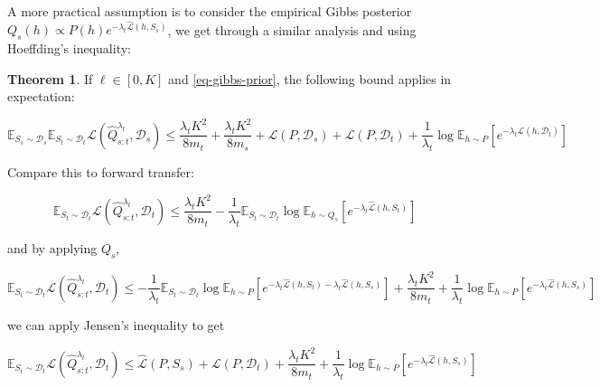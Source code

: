 \documentclass[letterpaper]{article}
\theoremstyle{definition}
\newtheorem{theorem}{Theorem}
\begin{document}

A more practical assumption is to consider the empirical Gibbs posterior $Q_s(h)\propto P(h)e^{-\lambda_t\hat{\mathcal{L}}(h,S_s)}$, we get through a similar analysis and using Hoeffding's inequality:

\begin{theorem}
If $\ell\in[0,K]$ and \eqref{eq-gibbs-prior}, the following bound applies in expectation:

\begin{equation} 
\mathbb{E}_{S_s\sim \mathcal{D}_s}\mathbb{E}_{S_t\sim \mathcal{D}_t}\mathcal{L}( \hat{Q}^{\lambda_t}_{s:t},\mathcal{D}_s)\leq \frac{\lambda_t K^2}{8m_t}+\frac{\lambda_t K^2}{8m_s}+\mathcal{L}(P,\mathcal{D}_s)+\mathcal{L}(P,\mathcal{D}_t) +\frac{1}{\lambda_t}\log\mathbb{E}_{h\sim P}\left [e^{-\lambda_t\mathcal{L}(h,\mathcal{D}_t)} \right ]
\end{equation}
\end{theorem}

Compare this to forward transfer:

\begin{equation*} 
\mathbb{E}_{S_t\sim \mathcal{D}_t}\mathcal{L}( \hat{Q}^{\lambda_t}_{s:t},\mathcal{D}_t)\leq \frac{\lambda_t K^2}{8m_t} - \frac{1}{\lambda_t}\mathbb{E}_{S_t\sim \mathcal{D}_t}\log\mathbb{E}_{h\sim Q_s}\left [e^{-\lambda_t\hat{\mathcal{L}}(h,S_t) }\right ]
\end{equation*}

and by applying $Q_s$,

\begin{equation*} 
\mathbb{E}_{S_t\sim \mathcal{D}_t}\mathcal{L}( \hat{Q}^{\lambda_t}_{s:t},\mathcal{D}_t)\leq -\frac{1}{\lambda_t}\mathbb{E}_{S_t\sim \mathcal{D}_t}\log \mathbb{E}_{h\sim P}\left [e^{-\lambda_t\hat{\mathcal{L}}(h,S_t)-\lambda_t\hat{\mathcal{L}}(h,S_s)}\right ]+\frac{\lambda_t K^2}{8m_t}+\frac{1}{\lambda_t}\log\mathbb{E}_{h\sim P}\left [e^{-\lambda_t\hat{\mathcal{L}}(h,S_s)} \right ]
\end{equation*}

we can apply Jensen's inequality to get

\begin{equation*} 
\mathbb{E}_{S_t\sim \mathcal{D}_t}\mathcal{L}( \hat{Q}^{\lambda_t}_{s:t},\mathcal{D}_t)\leq \hat{\mathcal{L}}(P,S_s)+\mathcal{L}(P,\mathcal{D}_t)+\frac{\lambda_t K^2}{8m_t}+\frac{1}{\lambda_t}\log\mathbb{E}_{h\sim P}\left [e^{-\lambda_t\hat{\mathcal{L}}(h,S_s)} \right ]
\end{equation*}
\end{document}
